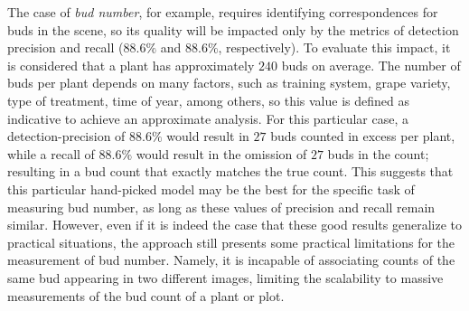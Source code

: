 \documentclass[a4paper,authoryear,review]{elsarticle}
\begin{document}
The case of \emph{bud number}, for example, requires identifying correspondences for buds in the scene, so its quality will be impacted only by the metrics of detection precision and recall ($88.6\%$ and $88.6\%$, respectively). To evaluate this impact, it is considered that a plant has approximately $240$ buds on average. The number of buds per plant depends on many factors, such as training system, grape variety, type of treatment, time of year, among others, so this value is defined as indicative to achieve an approximate analysis. For this particular case, a detection-precision of $88.6\%$ would result in $27$ buds counted in excess per plant, while a recall of $88.6\%$ would result in the omission of $27$ buds in the count; resulting in a bud count that exactly matches the true count. This suggests that this particular hand-picked model may be the best for the specific task of measuring bud number, as long as these values of precision and recall remain similar. 
%
However, even if it is indeed the case that these good results generalize to practical situations, the approach still presents some practical limitations for the measurement of bud number. Namely, it is incapable of associating counts of the same bud appearing in two different images, limiting the scalability to massive measurements of the bud count of a plant or plot. 
\end{document}
